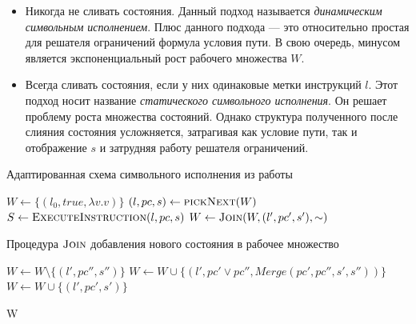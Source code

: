 \begin{enumerate}
    \begin{itemize}
        \item Никогда не сливать состояния. Данный подход называется \emph{динамическим символьным исполнением}. Плюс данного подхода --- это относительно простая для решателя ограничений формула условия пути. В свою очередь, минусом является экспоненциальный рост рабочего множества $W$.
        \item Всегда сливать состояния, если у них одинаковые метки инструкций $l$. Этот подход носит название \emph{статического символьного исполнения}. Он решает проблему роста множества состояний. Однако структура полученного после слияния состояния усложняется, затрагивая как условие пути, так и отображение $s$ и затрудняя работу решателя ограничений.
    \end{itemize}
\end{enumerate}

\begin{algorithm}
    \caption{Адаптированная схема символьного исполнения из работы~\cite{kuznetsov2012efficient}} \label{alg_kuznetsov}
\begin{algorithmic}[1]
        \State $W \gets \{(l_0, true, \lambda v.v)\}$
            \State $(l,pc,s) \gets \textsc{pickNext}(W)$ \label{pickNext}
            \State {}
            \State $S \gets \textsc{ExecuteInstruction}(l, pc, s)$
            \State {}
                \State $W \gets \textsc{Join}(W, (l',pc',s'),\sim)$
            \EndFor
        \EndWhile
        \State {}\;
    \EndProcedure
\end{algorithmic}
\end{algorithm}

\begin{algorithm}[H]
    \caption{Процедура $\textsc{Join}$ добавления нового состояния в рабочее множество} \label{join}
\begin{algorithmic}[1]
            \State $W \gets W \setminus \{(l',pc'',s'')\}$
            \State $W \gets W \cup \{(l',pc' \lor pc'', Merge(pc',pc'',s', s''))\}$
        \Else
            \State $W \gets W \cup \{(l', pc', s')\}$
        \EndIf

        \State \Return W 
    \EndProcedure
\end{algorithmic}
\end{algorithm}

